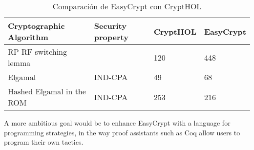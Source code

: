 \documentclass[runningheads,a4paper]{llncs}
\begin{document}
\begin{table}
  \caption{Comparación de EasyCrypt con CryptHOL}
  \label{tab:simple1}
  \centering
  \begin{tabular}{ |p{4cm}|p{1.5cm}|p{1.5cm}|p{1.5cm}|  }
 \hline
 Cryptographic Algorithm & Security property & CryptHOL & EasyCrypt\\\cline{1-4}
 \hline
 RP-RF switching lemma &  & 120 & 448\\
 Elgamal & IND-CPA & 49  & 68\\
 Hashed Elgamal in the ROM & IND-CPA & 253 &  216\\
 \hline
\end{tabular}
\end{table}






A more ambitious goal
would be to enhance EasyCrypt with a language for programming strategies, in
the way proof assistants such as Coq allow users to program their own tactics.
\end{document}
